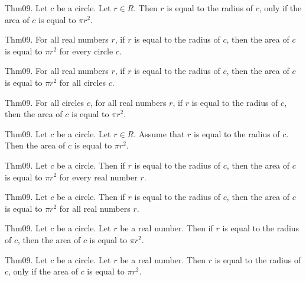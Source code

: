\documentclass{article}
\begin{document}
Thm09. Let $c$ be a circle. Let $r \in R$. Then $r$ is equal to the radius of $c$, only if the area of $c$ is equal to $\pi r ^ {2}$.

Thm09. For all real numbers $r$, if $r$ is equal to the radius of $c$, then the area of $c$ is equal to $\pi r ^ {2}$ for every circle $c$.

Thm09. For all real numbers $r$, if $r$ is equal to the radius of $c$, then the area of $c$ is equal to $\pi r ^ {2}$ for all circles $c$.

Thm09. For all circles $c$, for all real numbers $r$, if $r$ is equal to the radius of $c$, then the area of $c$ is equal to $\pi r ^ {2}$.

Thm09. Let $c$ be a circle. Let $r \in R$. Assume that $r$ is equal to the radius of $c$. Then the area of $c$ is equal to $\pi r ^ {2}$.

Thm09. Let $c$ be a circle. Then if $r$ is equal to the radius of $c$, then the area of $c$ is equal to $\pi r ^ {2}$ for every real number $r$.

Thm09. Let $c$ be a circle. Then if $r$ is equal to the radius of $c$, then the area of $c$ is equal to $\pi r ^ {2}$ for all real numbers $r$.

Thm09. Let $c$ be a circle. Let $r$ be a real number. Then if $r$ is equal to the radius of $c$, then the area of $c$ is equal to $\pi r ^ {2}$.

Thm09. Let $c$ be a circle. Let $r$ be a real number. Then $r$ is equal to the radius of $c$, only if the area of $c$ is equal to $\pi r ^ {2}$.
\end{document}

